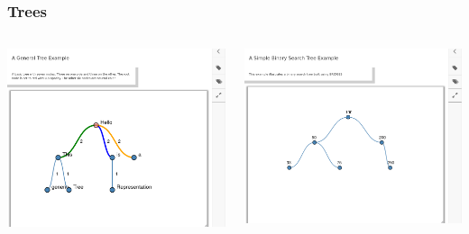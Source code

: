 \documentclass[aspectratio=169]{beamer}
\begin{document}
\begin{frame}
  \frametitle{Trees}

  \begin{columns}
    \includegraphics[width=1\linewidth]{viz_figs/Tree1.png}

    \includegraphics[width=1\linewidth]{viz_figs/Tree2.png}
  \end{columns}  
\end{frame}
\end{document}
